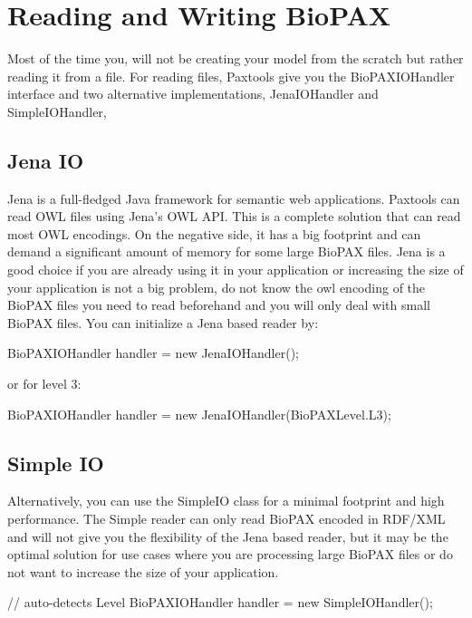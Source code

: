 \documentclass{tufte-book}
\begin{document}
\section{Reading and Writing BioPAX }

Most of the time you, will not be creating your model from the scratch but rather reading it from a file. For reading files, Paxtools give you the BioPAXIOHandler interface and two alternative implementations, JenaIOHandler and SimpleIOHandler,

\subsection{Jena IO}

Jena is a full-fledged Java framework for semantic web applications. Paxtools can read OWL files using Jena's OWL API. This is a complete solution that can read most OWL encodings. On the negative side, it has a big footprint and can demand a significant amount of memory for some large BioPAX files. Jena is a good choice if you are already using it in your application or increasing the size of your application is not a big problem, do not know the owl encoding of the BioPAX files you need to read beforehand and you will only deal with small BioPAX files.   
You can initialize a Jena based reader by:

\begin{javacode}
BioPAXIOHandler handler = new JenaIOHandler();
\end{javacode}

or for level 3:

\begin{javacode}
BioPAXIOHandler handler = new JenaIOHandler(BioPAXLevel.L3);
\end{javacode}


\subsection{Simple IO}

Alternatively, you can use the SimpleIO class for a minimal footprint and high performance. The Simple reader can only read BioPAX encoded in RDF/XML and will not give you the flexibility of the Jena based reader, but it may be the optimal solution for use cases where you are processing large BioPAX files or do not want to increase the size of your application.

\begin{javacode}
 // auto-detects Level 
BioPAXIOHandler handler = new SimpleIOHandler();
\end{javacode}
\end{document}
